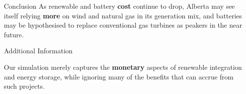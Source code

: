 \documentclass[final]{beamer}
\newlength{\onecolwid}
\begin{document}
\begin{frame}[t]
\begin{columns}[t]
\begin{column}{\onecolwid}
\begin{alertblock}{Conclusion}
As renewable and battery \textbf{cost} continue to drop, Alberta may see itself relying \textbf{more} on wind and natural gas in its generation mix, and batteries may be hypothesised to replace conventional gas turbines as peakers in the near future. 

\end{alertblock}


\begin{block}{Additional Information}

Our simulation merely captures the \textbf{monetary} aspects of renewable integration and energy storage, while ignoring many of the benefits that can accrue from such projects.

\end{block}


%
%


%
%
%



\end{column}
\end{columns}
\end{frame}
\end{document}
